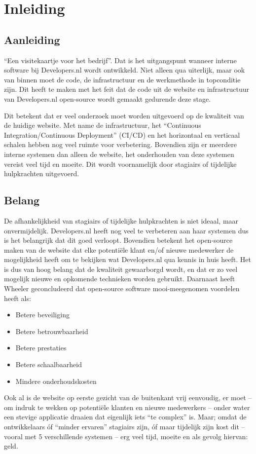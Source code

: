 \chapter{Inleiding}

\label{Chapter1}


\section{Aanleiding}

\enquote{Een visitekaartje voor het bedrijf}. Dat is het uitgangspunt wanneer interne software bij Developers.nl wordt ontwikkeld. Niet alleen qua uiterlijk, maar ook van binnen moet de code, de infrastructuur en de werkmethode in topconditie zijn. Dit heeft te maken met het feit dat de code uit de website en infrastructuur van Developers.nl open-source wordt gemaakt gedurende deze stage.

Dit betekent dat er veel onderzoek moet worden uitgevoerd op de kwaliteit van de huidige website. Met name de infrastructuur, het \enquote{Continuous Integration/Continuous Deployment} (CI/CD) en het horizontaal en verticaal schalen hebben nog veel ruimte voor verbetering. Bovendien zijn er meerdere interne systemen dan alleen de website, het onderhouden van deze systemen vereist veel tijd en moeite. Dit wordt voornamelijk door stagiairs of tijdelijke hulpkrachten uitgevoerd.

\section{Belang}

De afhankelijkheid van stagiairs of tijdelijke hulpkrachten is niet ideaal, maar onvermijdelijk. Developers.nl heeft nog veel te verbeteren aan haar systemen dus is het belangrijk dat dit goed verloopt. Bovendien betekent het open-source maken van de website dat elke potentiële klant en/of nieuwe medewerker de mogelijkheid heeft om te bekijken wat Developers.nl qua kennis in huis heeft. Het is dus van hoog belang dat de kwaliteit gewaarborgd wordt, en dat er zo veel mogelijk nieuwe en opkomende technieken worden gebruikt. Daarnaast heeft Wheeler \parencite{WhyOpenSource} geconcludeerd dat open-source software mooi-meegenomen voordelen heeft als:
\begin{itemize}
	\item Betere beveiliging
	\item Betere betrouwbaarheid 
	\item Betere prestaties
	\item Betere schaalbaarheid
	\item Mindere onderhoudskosten
\end{itemize}
Ook al is de website op eerste gezicht van de buitenkant vrij eenvoudig, er moet -- om indruk te wekken op potentiële klanten en nieuwe medewerkers -- onder water een stevige applicatie draaien dat eigenlijk iets \enquote{te complex} is. Maar; omdat de ontwikkelaars óf \enquote{minder ervaren} stagiairs zijn, óf maar tijdelijk zijn kost dit -- vooral met 5 verschillende systemen -- erg veel tijd, moeite en als gevolg hiervan: geld.

